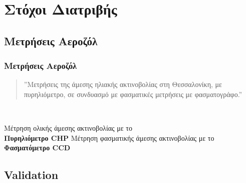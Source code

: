\documentclass[noamsthm,12pt]{beamer}
\begin{document}
% 
% 
% 
% 	
% 	
% 	


\section[Στόχοι]{Στόχοι Διατριβής}
\subsection{Μετρήσεις Αεροζόλ}

\begin{frame}
	\frametitle{Μετρήσεις Αεροζόλ}
	\vspace{-1cm}
	\begin{quote}
		\justifying
	 ''Μετρήσεις της άμεσης ηλιακής ακτινοβολίας στη Θεσσαλονίκη, με πυρηλιόμετρο, σε συνδυασμό με φασματικές μετρήσεις με φασματογράφο.''
	\end{quote}
	\hfill
	\ \\
	\hfill
	\begin{outline}
		\1 Μέτρηση ολικής άμεσης ακτινοβολίας με το\\
		\hfill \textbf{Πυρηλιόμετρο CHP} \hfill \phantom{d} 
		\1 Μέτρηση φασματικής άμεσης ακτινοβολίας με το\\
		\hfill \textbf{Φασματόμετρο CCD} \hfill \phantom{d} 
	\end{outline}
\end{frame}

\subsection{Validation}
\end{document}
